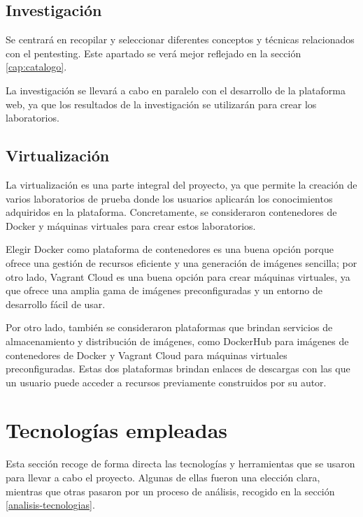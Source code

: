         \subsection{Investigación}
        
            Se centrará en recopilar y seleccionar diferentes conceptos y técnicas relacionados con el pentesting. Este apartado se verá mejor reflejado en la sección \ref{cap:catalogo}.

            La investigación se llevará a cabo en paralelo con el desarrollo de la plataforma web, ya que los resultados de la investigación se utilizarán para crear los laboratorios.
        
        \subsection{Virtualización}

            La virtualización es una parte integral del proyecto, ya que permite la creación de varios laboratorios de prueba donde los usuarios aplicarán los conocimientos adquiridos en la plataforma. Concretamente, se consideraron contenedores de Docker y máquinas virtuales para crear estos laboratorios.
            
            Elegir Docker como plataforma de contenedores es una buena opción porque ofrece una gestión de recursos eficiente y una generación de imágenes sencilla; por otro lado, Vagrant Cloud es una buena opción para crear máquinas virtuales, ya que ofrece una amplia gama de imágenes preconfiguradas y un entorno de desarrollo fácil de usar.
            
            Por otro lado, también se consideraron plataformas que brindan servicios de almacenamiento y distribución de imágenes, como DockerHub para imágenes de contenedores de Docker y Vagrant Cloud para máquinas virtuales preconfiguradas. Estas dos plataformas brindan enlaces de descargas con las que un usuario puede acceder a recursos previamente construidos por su autor.

            \newpage

            
    \section{Tecnologías empleadas}
        \label{tecnologias}

        Esta sección recoge de forma directa las tecnologías y herramientas que se usaron para llevar a cabo el proyecto. Algunas de ellas fueron una elección clara, mientras que otras pasaron por un proceso de análisis, recogido en la sección \ref{analisis-tecnologias}.
        
